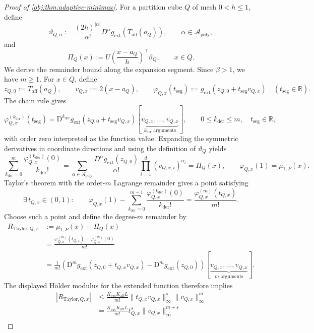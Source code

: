 \begin{proof}[Proof of \cref{obj:thm:adaptive-minimax}]
For a partition cube \(Q\) of mesh \(0<h\le1\), define
\[
\vartheta_{Q,\alpha}
:=
\frac{(2h)^{|\alpha|}}{\alpha!}
D^\alpha g_{\mathrm{ext}}(T_{\mathrm{aff}}(a_Q)),
\qquad \alpha\in\mathcal A_{\mathrm{poly}},
\]
and
\[
\Pi_Q(x)
:=
U\!\left(\frac{x-a_Q}{h}\right)^\top\vartheta_Q,
\qquad x\in Q.
\]
We derive the remainder bound along the expansion segment. Since \(\beta>1\), we have \(m\ge1\). For \(x\in Q\), define
\[
z_{Q,0}:=T_{\mathrm{aff}}(a_Q),
\qquad
v_{Q,x}:=2(x-a_Q),
\qquad
\varphi_{Q,x}(t_{\mathrm{seg}})
:=g_{\mathrm{ext}}(z_{Q,0}+t_{\mathrm{seg}}v_{Q,x})
\quad(t_{\mathrm{seg}}\in\mathbb R).
\]
The chain rule gives
\[
\varphi_{Q,x}^{(k_{\mathrm{der}})}(t_{\mathrm{seg}})
=
\mathrm D^{k_{\mathrm{der}}}g_{\mathrm{ext}}
(z_{Q,0}+t_{\mathrm{seg}}v_{Q,x})
[\underbrace{v_{Q,x},\ldots,v_{Q,x}}_{k_{\mathrm{der}}\text{ arguments}}],
\qquad
0\le k_{\mathrm{der}}\le m,
\quad t_{\mathrm{seg}}\in\mathbb R,
\]
with order zero interpreted as the function value. Expanding the symmetric derivatives in coordinate directions and using the definition of \(\vartheta_Q\) yields
\[
\sum_{k_{\mathrm{der}}=0}^{m}
\frac{\varphi_{Q,x}^{(k_{\mathrm{der}})}(0)}{k_{\mathrm{der}}!}
=
\sum_{\alpha\in\mathcal A_{\mathrm{poly}}}
\frac{D^\alpha g_{\mathrm{ext}}(z_{Q,0})}{\alpha!}
\prod_{i=1}^{d}(v_{Q,x,i})^{\alpha_i}
=\Pi_Q(x),
\qquad
\varphi_{Q,x}(1)=\mu_{1,P}(x).
\]
Taylor's theorem with the order-\(m\) Lagrange remainder gives a point satisfying
\[
\exists\,t_{Q,x}\in(0,1):\qquad
\varphi_{Q,x}(1)
-
\sum_{k_{\mathrm{der}}=0}^{m-1}
\frac{\varphi_{Q,x}^{(k_{\mathrm{der}})}(0)}{k_{\mathrm{der}}!}
=
\frac{\varphi_{Q,x}^{(m)}(t_{Q,x})}{m!}.
\]
Choose such a point and define the degree-\(m\) remainder by
\[
\begin{aligned}
R_{\mathrm{Taylor},Q,x}
&:=\mu_{1,P}(x)-\Pi_Q(x)\\
&=\frac{\varphi_{Q,x}^{(m)}(t_{Q,x})
-\varphi_{Q,x}^{(m)}(0)}{m!}\\
&=\frac1{m!}
\left(
\mathrm D^m g_{\mathrm{ext}}(z_{Q,0}+t_{Q,x}v_{Q,x})
-\mathrm D^m g_{\mathrm{ext}}(z_{Q,0})
\right)
[\underbrace{v_{Q,x},\ldots,v_{Q,x}}_{m\text{ arguments}}].
\end{aligned}
\]
The displayed Hölder modulus for the extended function therefore implies
\[
\begin{aligned}
|R_{\mathrm{Taylor},Q,x}|
&\le
\frac{K_{\mathrm{ext}}K_{\mathrm{aff}}L}{m!}
\|t_{Q,x}v_{Q,x}\|_\infty^s
\|v_{Q,x}\|_\infty^m\\
&=
\frac{K_{\mathrm{ext}}K_{\mathrm{aff}}L}{m!}
 t_{Q,x}^{s}\|v_{Q,x}\|_\infty^{m+s}\\

\end{aligned}\]
\end{proof}
